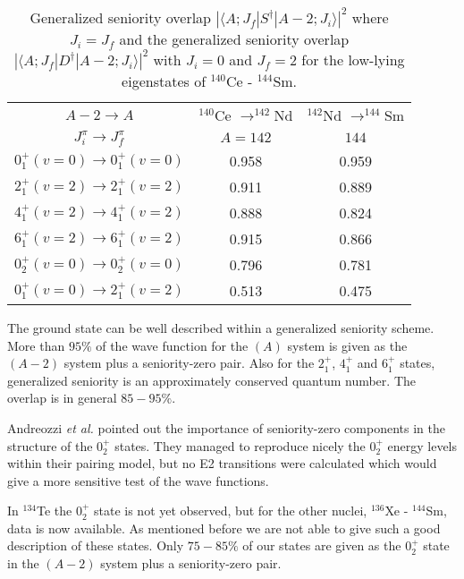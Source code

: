 \begin{table}[htbp]
\begin{center}
\caption{Generalized seniority overlap 
$|\langle A;J_{f}|S^{\dagger}|A-2;J_{i}\rangle |^{2}$ where $J_{i} = J_{f}$
and the generalized seniority overlap 
$|\langle A; J_{f}|D^{\dagger}|A-2;J_{i}\rangle |^{2}$ with $J_{i} = 0$ and
$J_{f} = 2$ for the low-lying eigenstates of $^{140}$Ce - $^{144}$Sm.}
\begin{tabular}{ccc}
\hline
$A-2 \rightarrow A$ & $^{140}$Ce $\rightarrow ^{142}$Nd & 
$^{142}$Nd $\rightarrow ^{144}$Sm \\
$J_{i}^{\pi} \rightarrow J_{f}^{\pi}$  & $A=142$ & $144$ \\
\hline
$0^{+}_{1}(v=0) \rightarrow 0^{+}_{1}(v=0)$    & 0.958   & 0.959   \\
$2^{+}_{1}(v=2) \rightarrow 2^{+}_{1}(v=2)$    & 0.911   & 0.889   \\
$4^{+}_{1}(v=2) \rightarrow 4^{+}_{1}(v=2)$    & 0.888   & 0.824   \\
$6^{+}_{1}(v=2) \rightarrow 6^{+}_{1}(v=2)$    & 0.915   & 0.866   \\
$0^{+}_{2}(v=0) \rightarrow 0^{+}_{2}(v=0)$    & 0.796   & 0.781   \\
$0^{+}_{1}(v=0) \rightarrow 2^{+}_{1}(v=2)$    & 0.513   & 0.475   \\
\hline
\end{tabular}
\label{tab:even-sen-2}
\end{center}
\end{table}

The ground state can be well described within a generalized seniority scheme.
More than $95\%$ of the wave function for the $(A)$ system is given as the 
$(A-2)$ system plus a seniority-zero pair. Also for the $2^{+}_{1}$, 
$4^{+}_{1}$ and $6^{+}_{1}$ states, generalized seniority is an 
approximately conserved quantum number. The overlap is in general $85-95\%$.

Andreozzi {\sl et al.} \cite{acgp90} pointed out the importance of 
seniority-zero components in the structure of the $0^{+}_{2}$ states. 
They managed to reproduce nicely the $0^{+}_{2}$ energy levels 
within their pairing model, but no E2 transitions were calculated which 
would give a more sensitive test of the wave functions.

In $^{134}$Te the $0^{+}_{2}$ state is not yet observed, but for the other 
nuclei, $^{136}$Xe - $^{144}$Sm, data is now available. 
As mentioned before we are not able to give such a good description of 
these states. Only $75 - 85\%$ of our states are given as the $0^{+}_{2}$ 
state in the $(A-2)$ system plus a seniority-zero pair.

